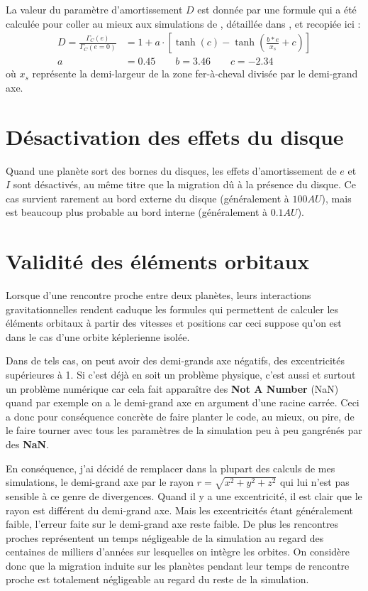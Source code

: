 La valeur du paramètre d'amortissement $D$ est donnée par une formule qui a été calculée pour coller au mieux aux simulations de \cite{bitsch2010orbital}, détaillée dans \cite{cossou2013convergence}, et recopiée ici : 
\begin{subequations}
\begin{align}
D = \frac{\Gamma_C(e)}{\Gamma_C (e=0)} &= 1 + a \cdot \left[\tanh(c) - \tanh\left(\frac{b * e}{x_s}+c\right)\right]\label{eq:eccentricity-influence}\\
a &= 0.45 \qquad b=3.46 \qquad c= -2.34
\end{align}
\end{subequations}
où $x_s$ représente la demi-largeur de la zone fer-à-cheval divisée par le demi-grand axe.

\section{Désactivation des effets du disque}
Quand une planète sort des bornes du disques, les effets d'amortissement de $e$ et $I$ sont désactivés, au même titre que la migration dû à la présence du disque. Ce cas survient rarement au bord externe du disque (généralement à $100\unit{AU}$), mais est beaucoup plus probable au bord interne (généralement à $0.1\unit{AU}$).

\section{Validité des éléments orbitaux}
Lorsque d'une rencontre proche entre deux planètes, leurs interactions gravitationnelles rendent caduque les formules qui permettent de calculer les éléments orbitaux à partir des vitesses et positions car ceci suppose qu'on est dans le cas d'une orbite képlerienne isolée. 

Dans de tels cas, on peut avoir des demi-grands axe négatifs, des excentricités supérieures à 1. Si c'est déjà en soit un problème physique, c'est aussi et surtout un problème numérique car cela fait apparaître des \textbf{Not A Number} (NaN) quand par exemple on a le demi-grand axe en argument d'une racine carrée. Ceci a donc pour conséquence concrète de faire planter le code, au mieux, ou pire, de le faire tourner avec tous les paramètres de la simulation peu à peu gangrénés par des \textbf{NaN}. 

En conséquence, j'ai décidé de remplacer dans la plupart des calculs de mes simulations, le demi-grand axe par le rayon $r=\sqrt{x^2+y^2+z^2}$ qui lui n'est pas sensible à ce genre de divergences. Quand il y a une excentricité, il est clair que le rayon est différent du demi-grand axe. Mais les excentricités étant généralement faible, l'erreur faite sur le demi-grand axe reste faible. De plus les rencontres proches représentent un temps négligeable de la simulation au regard des centaines de milliers d'années sur lesquelles on intègre les orbites. On considère donc que la migration induite sur les planètes pendant leur temps de rencontre proche est totalement négligeable au regard du reste de la simulation.



